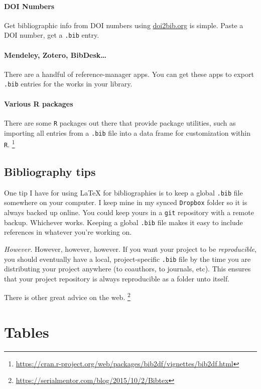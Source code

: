 \documentclass[12pt
              ]{article}
\begin{document}
\paragraph{DOI Numbers} Get bibliographic info from DOI numbers using \url{doi2bib.org} is simple. Paste a DOI number, get a \texttt{.bib} entry.


\paragraph{Mendeley, Zotero, BibDesk\ldots} There are a handful of reference-manager apps. You can get these apps to export \texttt{.bib} entries for the works in your library.

\paragraph{Various R packages} There are some \texttt{R} packages out there that provide package utilities, such as importing all entries from a \texttt{.bib} file into a data frame for customization within \texttt{R}.%
  \footnote{\url{https://cran.r-project.org/web/packages/bib2df/vignettes/bib2df.html}}



\subsection{Bibliography tips}

One tip I have for using {\LaTeX} for bibliographies is to keep a global \texttt{.bib} file somewhere on your computer. I keep mine in my synced \texttt{Dropbox} folder so it is always backed up online. You could keep yours in a \texttt{git} repository with a remote backup. Whichever works. Keeping a global \texttt{.bib} file makes it easy to include references in whatever you're working on. 

\emph{However.} However, however, however. If you want your project to be \emph{reproducible}, you should eventually have a local, project-specific \texttt{.bib} file by the time you are distributing your project anywhere (to coauthors, to journals, etc). This ensures that your project repository is always reproducible as a folder unto itself. 

There is other great advice on the web.%
  \footnote{\url{https://serialmentor.com/blog/2015/10/2/Bibtex}}
 




\section{Tables}
\end{document}

